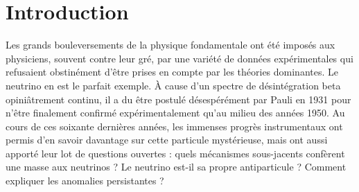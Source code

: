 

\chapter*{Introduction}
\label{chap:introduction}




Les grands bouleversements de la physique fondamentale ont été imposés aux physiciens, souvent contre leur gré, par une variété de données expérimentales qui refusaient obstinément d'être prises en compte par les théories dominantes. Le neutrino en est le parfait exemple. À cause d'un spectre de désintégration beta opiniâtrement continu, il a du être postulé désespérément par Pauli en 1931 pour n'être finalement confirmé expérimentalement qu'au milieu des années 1950. Au cours de ces soixante dernières années, les immenses progrès instrumentaux ont permis d'en savoir davantage sur cette particule mystérieuse, mais ont aussi apporté leur lot de questions ouvertes : quels mécanismes sous-jacents confèrent une masse aux neutrinos ? Le neutrino est-il sa propre antiparticule ? Comment expliquer les anomalies persistantes ?\\

